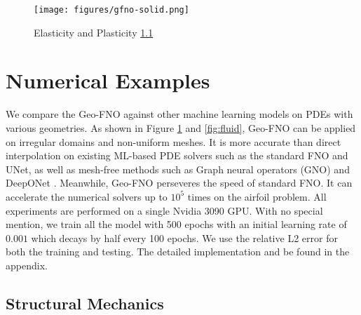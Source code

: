 \documentclass{article}
\begin{document}
\begin{figure}
    \centering
    \texttt{[image: figures/gfno-solid.png]}
    \caption{Elasticity and Plasticity \ref{ssec:solid}}
    \label{fig:solid}
\end{figure}

\section{Numerical Examples}
We compare the Geo-FNO against other machine learning models on PDEs with various geometries. As shown in Figure \ref{fig:solid} and \ref{fig:fluid}, Geo-FNO can be applied on irregular domains and non-uniform meshes. It is more accurate than direct interpolation on existing ML-based PDE solvers such as the standard FNO\citep{li2020fourier} and UNet\citep{ronneberger2015u}, as well as mesh-free methods such as Graph neural operators (GNO) \citep{li2020neural} and DeepONet \citep{lu2019deeponet}. Meanwhile, Geo-FNO perseveres the speed of standard FNO. It can accelerate the numerical solvers up to $10^5$ times on the airfoil problem. All experiments are performed on a single Nvidia 3090 GPU. With no special mention, we train all the model with 500 epochs with an initial learning rate of $0.001$ which decays by half every 100 epochs. We use the relative L2 error for both the training and testing. The detailed implementation and be found in the appendix.

\subsection{Structural Mechanics}
\label{ssec:solid}
\end{document}

